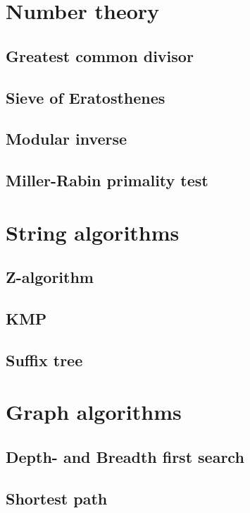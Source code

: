 \documentclass[a4paper,10pt]{article}
\begin{document}
\pagestyle{fancy}
\chead{}
\rhead{\thepage}
\lfoot{}
\cfoot{}
\rfoot{}


\tableofcontents
\newpage
\section{Number theory}
\subsection{Greatest common divisor}

\subsection{Sieve of Eratosthenes}

\subsection{Modular inverse}
\subsection{Miller-Rabin primality test}
\section{String algorithms}
\subsection{Z-algorithm}
\subsection{KMP}
\subsection{Suffix tree}
\section{Graph algorithms}
\subsection{Depth- and Breadth first search}

\subsection{Shortest path}
\end{document}
